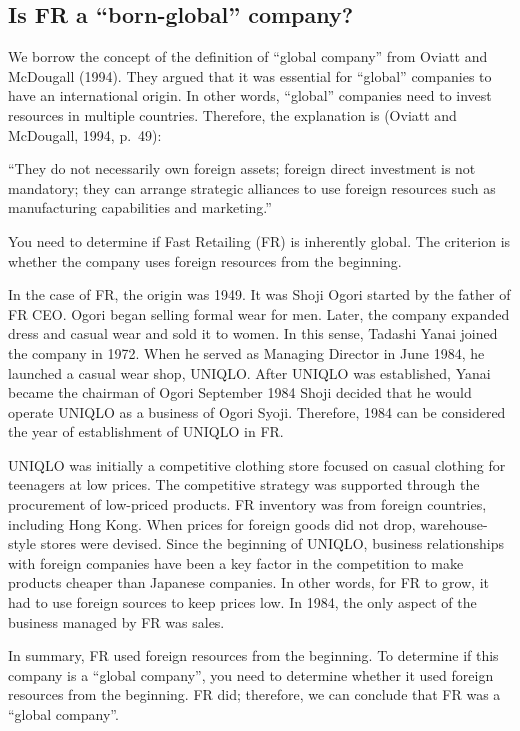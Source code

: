\documentclass[12pt,]{article}
\begin{document}
\hypertarget{is-fr-a-born-global-company}{%
\subsection{Is FR a ``born-global''
company?}\label{is-fr-a-born-global-company}}

We borrow the concept of the definition of ``global company'' from
Oviatt and McDougall (1994). They argued that it was essential for
``global'' companies to have an international origin. In other words,
``global'' companies need to invest resources in multiple countries.
Therefore, the explanation is (Oviatt and McDougall, 1994, p.~49):

``They do not necessarily own foreign assets; foreign direct investment
is not mandatory; they can arrange strategic alliances to use foreign
resources such as manufacturing capabilities and marketing.''

You need to determine if Fast Retailing (FR) is inherently global. The
criterion is whether the company uses foreign resources from the
beginning.

In the case of FR, the origin was 1949. It was Shoji Ogori started by
the father of FR CEO. Ogori began selling formal wear for men. Later,
the company expanded dress and casual wear and sold it to women. In this
sense, Tadashi Yanai joined the company in 1972. When he served as
Managing Director in June 1984, he launched a casual wear shop, UNIQLO.
After UNIQLO was established, Yanai became the chairman of Ogori
September 1984 Shoji decided that he would operate UNIQLO as a business
of Ogori Syoji. Therefore, 1984 can be considered the year of
establishment of UNIQLO in FR.

UNIQLO was initially a competitive clothing store focused on casual
clothing for teenagers at low prices. The competitive strategy was
supported through the procurement of low-priced products. FR inventory
was from foreign countries, including Hong Kong. When prices for foreign
goods did not drop, warehouse-style stores were devised. Since the
beginning of UNIQLO, business relationships with foreign companies have
been a key factor in the competition to make products cheaper than
Japanese companies. In other words, for FR to grow, it had to use
foreign sources to keep prices low. In 1984, the only aspect of the
business managed by FR was sales.

In summary, FR used foreign resources from the beginning. To determine
if this company is a ``global company'', you need to determine whether
it used foreign resources from the beginning. FR did; therefore, we can
conclude that FR was a ``global company''.
\end{document}
